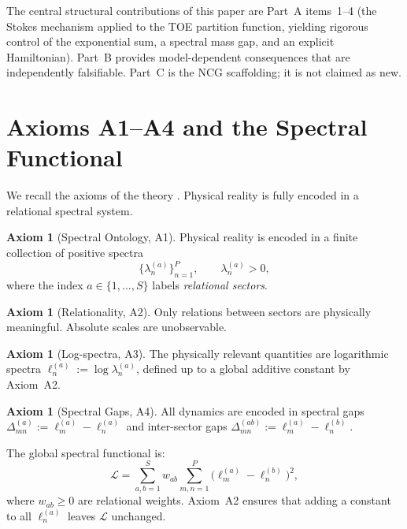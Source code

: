 \documentclass[12pt]{article}
\theoremstyle{definition}
\newtheorem{axiom}[theorem]{Axiom}
\theoremstyle{remark}
\begin{document}
\noindent
The central structural contributions of this paper are Part~A items~1--4
(the Stokes mechanism applied to the TOE partition function, yielding
rigorous control of the exponential sum, a spectral mass gap, and an
explicit Hamiltonian).  Part~B provides model-dependent consequences that
are independently falsifiable.  Part~C is the NCG scaffolding; it is not
claimed as new.

\section{Axioms A1--A4 and the Spectral Functional}
\label{sec:axioms}

We recall the axioms of the theory \cite{Olbryk2026v2}.
Physical reality is fully encoded in a relational spectral system.

\begin{axiom}[Spectral Ontology, A1]
Physical reality is encoded in a finite collection of positive spectra
\[
\bigl\{\lambda_n^{(a)}\bigr\}_{n=1}^{P},
\qquad \lambda_n^{(a)} > 0,
\]
where the index $a \in \{1,\ldots,S\}$ labels \emph{relational sectors}.
\end{axiom}

\begin{axiom}[Relationality, A2]
Only relations between sectors are physically meaningful.
Absolute scales are unobservable.
\end{axiom}

\begin{axiom}[Log-spectra, A3]
The physically relevant quantities are logarithmic spectra
$\ell_n^{(a)} := \log\lambda_n^{(a)}$, defined up to a global additive
constant by Axiom~A2.
\end{axiom}

\begin{axiom}[Spectral Gaps, A4]
All dynamics are encoded in spectral gaps
$\Delta_{mn}^{(a)} := \ell_m^{(a)} - \ell_n^{(a)}$ and
inter-sector gaps $\Delta^{(ab)}_{mn} := \ell_m^{(a)} - \ell_n^{(b)}$.
\end{axiom}

The global spectral functional is:
\begin{equation}\label{eq:L}
\mathcal{L}
= \sum_{a,b=1}^S w_{ab}
  \sum_{m,n=1}^P \bigl(\ell_m^{(a)} - \ell_n^{(b)}\bigr)^2,
\end{equation}
where $w_{ab} \geq 0$ are relational weights.  Axiom~A2 ensures that
adding a constant to all $\ell_n^{(a)}$ leaves $\mathcal{L}$ unchanged.
\end{document}
